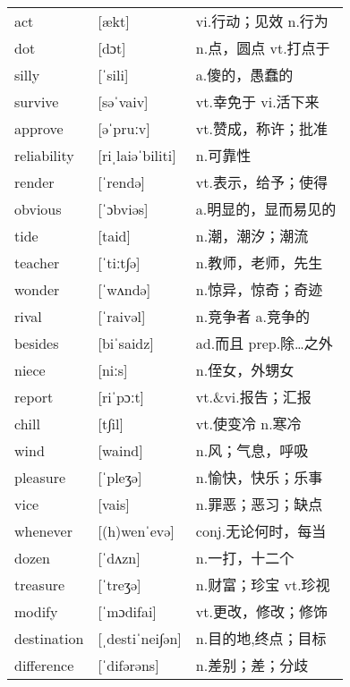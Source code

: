 \documentclass[a4paper]{article}
\begin{document}
\section{}
\begin{tabular}{l l l}

act & [ækt] & vi.行动；见效 n.行为 \\
dot & [dɔt] & n.点，圆点 vt.打点于 \\
silly & [ˈsili] & a.傻的，愚蠢的 \\
survive & [səˈvaiv] & vt.幸免于 vi.活下来 \\
approve & [əˈpruːv] & vt.赞成，称许；批准 \\
reliability & [riˌlaiəˈbiliti] & n.可靠性 \\
render & [ˈrendə] & vt.表示，给予；使得 \\
obvious & [ˈɔbviəs] & a.明显的，显而易见的 \\
tide & [taid] & n.潮，潮汐；潮流 \\
teacher & [ˈtiːt∫ə] & n.教师，老师，先生 \\
wonder & [ˈwʌndə] & n.惊异，惊奇；奇迹 \\
rival & [ˈraivəl] & n.竞争者 a.竞争的 \\
besides & [biˈsaidz] & ad.而且 prep.除…之外 \\
niece & [niːs] & n.侄女，外甥女 \\
report & [riˈpɔːt] & vt.\&vi.报告；汇报 \\
chill & [t∫il] & vt.使变冷 n.寒冷 \\
wind & [waind] & n.风；气息，呼吸 \\
pleasure & [ˈpleʒə] & n.愉快，快乐；乐事 \\
vice & [vais] & n.罪恶；恶习；缺点 \\
whenever & [(h)wenˈevə] & conj.无论何时，每当 \\
dozen & [ˈdʌzn] & n.一打，十二个 \\
treasure & [ˈtreʒə] & n.财富；珍宝 vt.珍视 \\
modify & [ˈmɔdifai] & vt.更改，修改；修饰 \\
destination & [ˌdestiˈnei∫ən] & n.目的地,终点；目标 \\
difference & [ˈdifərəns] & n.差别；差；分歧 \\

\end{tabular}
\end{document}
